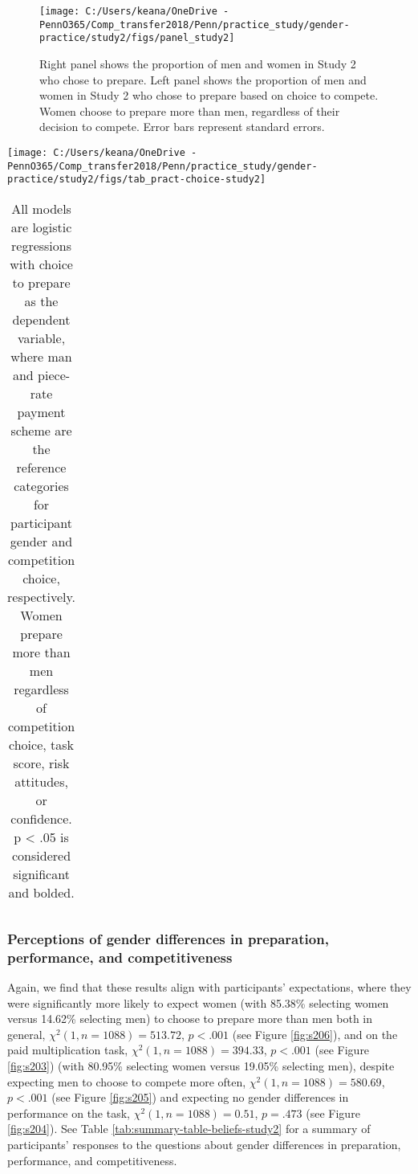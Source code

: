 \documentclass[letterpaper, nobind]{templates/ociamthesis}
\begin{document}
\begin{figure}

{\centering \texttt{[image: C:/Users/keana/OneDrive - PennO365/Comp\_transfer2018/Penn/practice\_study/gender-practice/study2/figs/panel\_study2]} 

}

\caption{Right panel shows the proportion of men and women in Study 2 who chose to prepare. Left panel shows the proportion of men and women in Study 2 who chose to prepare based on choice to compete. Women choose to prepare more than men, regardless of their decision to compete. Error bars represent standard errors.}\label{fig:panel-study2}
\end{figure}

\begin{center}\texttt{[image: C:/Users/keana/OneDrive - PennO365/Comp\_transfer2018/Penn/practice\_study/gender-practice/study2/figs/tab\_pract-choice-study2]} \end{center}

\begin{table}[ht]
\centering
\begingroup\fontsize{0.1pt}{0.1pt}\selectfont
\begin{tabular}{r}
   \\ 
 \end{tabular}
\endgroup
\caption{All models are logistic regressions with choice to prepare as the dependent variable, where man and piece-rate payment scheme are the reference categories for participant gender and competition choice, respectively. Women prepare more than men regardless of competition choice, task score, risk attitudes, or confidence. p < .05 is considered significant and bolded.} 
\label{tab:tab-pract-choice-study2}
\end{table}

\hypertarget{perceptions-of-gender-differences-in-preparation-performance-and-competitiveness-2}{%
\subsubsection{Perceptions of gender differences in preparation, performance, and competitiveness}\label{perceptions-of-gender-differences-in-preparation-performance-and-competitiveness-2}}

Again, we find that these results align with participants' expectations, where they were significantly more likely to expect women (with 85.38\% selecting women versus 14.62\% selecting men) to choose to prepare more than men both in general, \(\chi^2(1, n = 1088) = 513.72\), \(p < .001\) (see Figure \ref{fig:s206}), and on the paid multiplication task, \(\chi^2(1, n = 1088) = 394.33\), \(p < .001\) (see Figure \ref{fig:s203}) (with 80.95\% selecting women versus 19.05\% selecting men), despite expecting men to choose to compete more often, \(\chi^2(1, n = 1088) = 580.69\), \(p < .001\) (see Figure \ref{fig:s205}) and expecting no gender differences in performance on the task, \(\chi^2(1, n = 1088) = 0.51\), \(p = .473\) (see Figure \ref{fig:s204}). See Table \ref{tab:summary-table-beliefs-study2} for a summary of participants' responses to the questions about gender differences in preparation, performance, and competitiveness.
\end{document}
